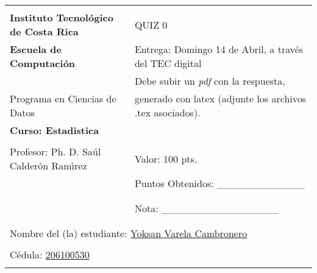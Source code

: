 \documentclass[spanish]{article}
\providecommand{\tabularnewline}{\\}
\begin{document}
\begin{flushleft}
\begin{tabular}{|l|l|}
\hline 
 & \tabularnewline
\textbf{\large{}Instituto Tecnol\'{o}gico de Costa Rica} & QUIZ 0\tabularnewline
\textbf{\large{}Escuela de Computaci\'{o}n} & Entrega: Domingo 14 de Abril, a trav\'{e}s del TEC digital\tabularnewline
 & Debe subir un \emph{pdf }con la respuesta,\tabularnewline
Programa en Ciencias de Datos & generado con latex (adjunte los archivos .tex asociados).\tabularnewline
\textbf{Curso: Estadistica} & \tabularnewline
 & \tabularnewline
Profesor: Ph. D. Sa\'{u}l Calder\'{o}n Ram\'{\i}rez & Valor: 100 pts.\tabularnewline
 & Puntos Obtenidos: \_\_\_\_\_\_\_\_\_\_\_\_\tabularnewline
 & \tabularnewline
 & \tabularnewline
 & Nota: \_\_\_\_\_\_\_\_\_\_\_\_\_\_\_\_\tabularnewline
 & \tabularnewline
\cline{2-2} 
\multicolumn{2}{|c|}{}\tabularnewline
\multicolumn{2}{|l|}{Nombre del (la) estudiante: \underline{Yoksan Varela Cambronero}}\tabularnewline
\multicolumn{1}{|l}{} & \tabularnewline
\multicolumn{1}{|l}{C\'{e}dula: \underline {206100530}} & \tabularnewline
\multicolumn{1}{|l}{} & \tabularnewline
\hline 
\end{tabular}
\par\end{flushleft}
\end{document}
